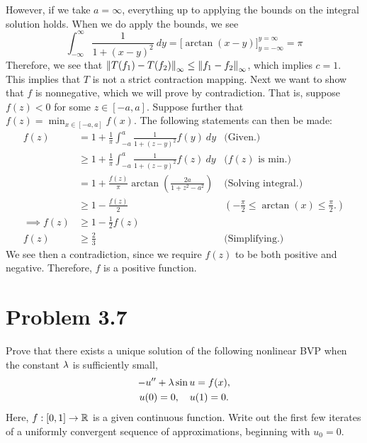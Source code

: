 \begin{solution}
    \newpage
    However, if we take $a = \infty$, everything up to applying the bounds on the integral solution holds. When we do apply the bounds, we see
    \[\int_{-\infty}^\infty \frac{1}{1+(x - y)^2} \ dy = \Big[\arctan (x - y) \Big]_{y = -\infty}^{y = \infty} = \pi\]
    Therefore, we see that $ \norm{T(f_1) - T(f_2)}_\infty \leq \norm{f_1 - f_2}_\infty$, which implies $c = 1$. This implies that $T$ is not a strict contraction mapping. Next we want to show that $f$ is nonnegative, which we will prove by contradiction. That is, suppose $f(z) < 0$ for some $z \in [-a, a]$. Suppose further that $f(z) = \min_{x \in [-a, a]} f(x)$. The following statements can then be made:
    \tightalignbreak
    \begin{align*}
        f(z) &= 1 + \frac{1}{\pi}\int_{-a}^a \frac{1}{1 + (z - y)^2} f(y) \ dy &\text{(Given.)}\\
        &\geq 1 + \frac{1}{\pi}\int_{-a}^a \frac{1}{1 + (z - y)^2} f(z) \ dy &\text{($f(z)$ is min.)}\\
        &= 1 + \frac{ f(z)}{\pi} \arctan\left( \frac{2a}{1 + z^2 - a^2} \right) &\text{(Solving integral.)}\\
        &\geq 1 - \frac{f(z)}{2} &(-\frac{\pi}{2} \leq \arctan (x) \leq \frac{\pi}{2}.)\\
        \implies f(z) &\geq 1 - \frac{1}{2}f(z) \\
        f(z) &\geq \frac{2}{3} &\text{(Simplifying.)}
    \end{align*}
    \vspace{-6mm}\alignbreak
    We see then a contradiction, since we require $f(z)$ to be both positive and negative. Therefore, $f$ is a positive function. 
\end{solution}

\newpage


\section{Problem 3.7}
Prove that there exists a unique solution of the following nonlinear BVP when the constant $\mathrm{\lambda}$ is sufficiently small, 
\begin{gather*}
    -u'' + \mathrm{\lambda} \sin u = f(x),\\
    u(0) = 0, \quad u(1) = 0.
\end{gather*}
Here, $f: [0, 1] \rightarrow \mathbb{R}$ is a given continuous function. Write out the first few iterates of a uniformly convergent sequence of approximations, beginning with $u_0 = 0$.
\partbreak
\begin{solution}


\end{solution}
